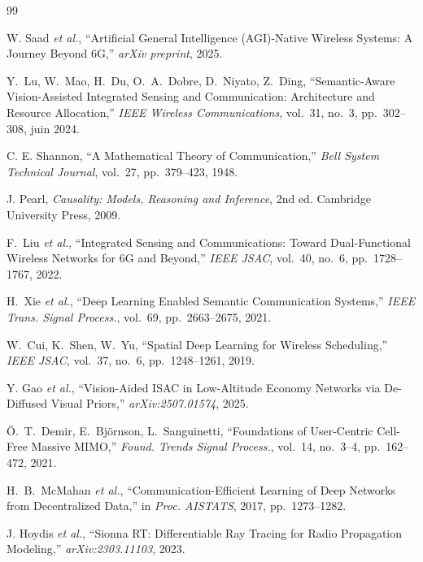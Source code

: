 \documentclass[12pt,a4paper,titlepage]{article}
\begin{document}
\newpage
\begin{thebibliography}{99}

W. Saad \textit{et al.},
``Artificial General Intelligence (AGI)-Native Wireless Systems: A Journey Beyond 6G,''
\textit{arXiv preprint}, 2025.

Y.~Lu, W.~Mao, H.~Du, O.~A.~Dobre, D.~Niyato, Z.~Ding,
``Semantic-Aware Vision-Assisted Integrated Sensing and Communication: Architecture and Resource Allocation,''
\textit{IEEE Wireless Communications}, vol.~31, no.~3, pp.~302--308, juin 2024.

C. E. Shannon,
``A Mathematical Theory of Communication,''
\textit{Bell System Technical Journal}, vol.~27, pp.~379--423, 1948.

J. Pearl,
\textit{Causality: Models, Reasoning and Inference}, 2nd ed.
Cambridge University Press, 2009.

F.~Liu \textit{et al.},
``Integrated Sensing and Communications: Toward Dual-Functional Wireless Networks for 6G and Beyond,''
\textit{IEEE JSAC}, vol.~40, no.~6, pp.~1728--1767, 2022.

H.~Xie \textit{et al.},
``Deep Learning Enabled Semantic Communication Systems,''
\textit{IEEE Trans. Signal Process.}, vol.~69, pp.~2663--2675, 2021.

W.~Cui, K.~Shen, W.~Yu,
``Spatial Deep Learning for Wireless Scheduling,''
\textit{IEEE JSAC}, vol.~37, no.~6, pp.~1248--1261, 2019.

Y. Gao \textit{et al.},
``Vision-Aided ISAC in Low-Altitude Economy Networks via De-Diffused Visual Priors,''
\textit{arXiv:2507.01574}, 2025.

Ö.~T.~Demir, E.~Björnson, L.~Sanguinetti,
``Foundations of User-Centric Cell-Free Massive MIMO,''
\textit{Found. Trends Signal Process.}, vol.~14, no.~3--4, pp.~162--472, 2021.

H.~B.~McMahan \textit{et al.},
``Communication-Efficient Learning of Deep Networks from Decentralized Data,''
in \textit{Proc. AISTATS}, 2017, pp.~1273--1282.

J. Hoydis \textit{et al.},
``Sionna RT: Differentiable Ray Tracing for Radio Propagation Modeling,''
\textit{arXiv:2303.11103}, 2023.


\end{thebibliography}
\end{document}
